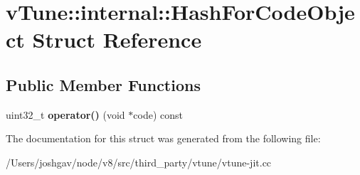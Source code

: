 \hypertarget{structv_tune_1_1internal_1_1_hash_for_code_object}{}\section{v\+Tune\+:\+:internal\+:\+:Hash\+For\+Code\+Object Struct Reference}
\label{structv_tune_1_1internal_1_1_hash_for_code_object}
\subsection*{Public Member Functions}
\begin{DoxyCompactItemize}
\item 
uint32\+\_\+t {\bfseries operator()} (void $\ast$code) const \hypertarget{structv_tune_1_1internal_1_1_hash_for_code_object_a44ecd837497e0553b1e92c6ae4536f90}{}\label{structv_tune_1_1internal_1_1_hash_for_code_object_a44ecd837497e0553b1e92c6ae4536f90}

\end{DoxyCompactItemize}


The documentation for this struct was generated from the following file\+:\begin{DoxyCompactItemize}
\item 
/\+Users/joshgav/node/v8/src/third\+\_\+party/vtune/vtune-\/jit.\+cc\end{DoxyCompactItemize}
